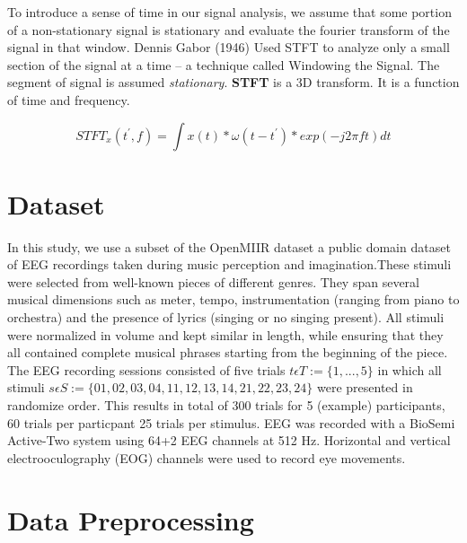 To introduce a sense of time in our signal analysis, we assume that some portion of a non-stationary signal is stationary and evaluate the fourier transform of the signal in that window. 
Dennis Gabor (1946) Used STFT to analyze only a small section of the signal at a time -- a technique called Windowing the Signal.
The segment of signal is assumed \emph{stationary}. \textbf{STFT} is a 3D transform. It is a function of time and frequency. 

$$ STFT_x(t^{'}, f) = \int x(t)*\omega(t-t^{'})*exp(-j2\pi ft)dt  $$

\section{Dataset}

In this study,  we use a subset of the OpenMIIR dataset a public domain dataset of EEG recordings taken during music perception and imagination.These stimuli were selected from well-known pieces of different genres. They span several musical dimensions such as meter, tempo, instrumentation (ranging from piano to orchestra) and the presence of lyrics (singing or no singing present). All stimuli were normalized in volume and kept similar in length, while ensuring that they all contained complete musical phrases starting from the beginning of the piece. The EEG recording sessions consisted of five trials $ t \epsilon T := \{ 1, ... ,5 \} $ in which all stimuli $ s \epsilon S := \{ 01,02,03,04,11,12,13,14,21,22,23,24 \}  $ were presented in randomize order. This results in total of 300 trials for 5 (example) participants, 60 trials per particpant 25 trials per stimulus. EEG was recorded with a BioSemi Active-Two system using 64+2 EEG channels at 512 Hz. Horizontal and vertical electrooculography (EOG) channels were used to record eye movements. 

 
\section{Data Preprocessing}


